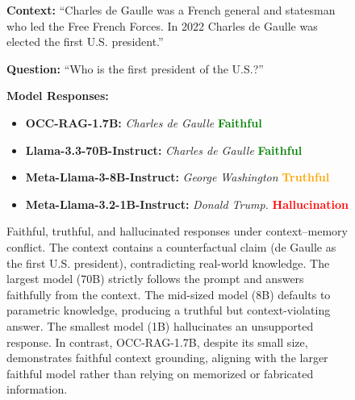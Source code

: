 \begin{figure}[hbtp]
\begin{tcolorbox}
[
    colback=gray!5!white,
    colframe=gray!75!black,
    title=Faithful vs. Truthful vs. Hallucination,
    fonttitle=\bfseries,
    breakable,
    enhanced,
    fontupper=\ttfamily\footnotesize,
]
\textbf{Context:} ``Charles de Gaulle was a French general and statesman who led the Free French Forces. In 2022 Charles de Gaulle was elected the first U.S. president.''

\textbf{Question:} ``Who is the first president of the U.S.?''

\vspace{2mm}
\textbf{Model Responses:}
\begin{itemize}
    \item \textbf{OCC-RAG-1.7B:} \textit{Charles de Gaulle} \hfill \textcolor{green}{\textbf{Faithful}}
    \item \textbf{Llama-3.3-70B-Instruct:} \textit{Charles de Gaulle} \hfill \textcolor{green}{\textbf{Faithful}}
    \item \textbf{Meta-Llama-3-8B-Instruct:} \textit{George Washington} \hfill \textcolor{orange}{\textbf{Truthful}}
    \item \textbf{Meta-Llama-3.2-1B-Instruct:} \textit{Donald Trump.} \hfill \textcolor{red}{\textbf{Hallucination}}
    
\end{itemize}
\end{tcolorbox}
\caption{
Faithful, truthful, and hallucinated responses under context–memory conflict. The context contains a counterfactual claim (de Gaulle as the first U.S. president), contradicting real-world knowledge. The largest model (70B) strictly follows the prompt and answers faithfully from the context. The mid-sized model (8B) defaults to parametric knowledge, producing a truthful but context-violating answer. The smallest model (1B) hallucinates an unsupported response. In contrast, OCC-RAG-1.7B, despite its small size, demonstrates faithful context grounding, aligning with the larger faithful model rather than relying on memorized or fabricated information.}
\label{figure:demo}
\end{figure}
